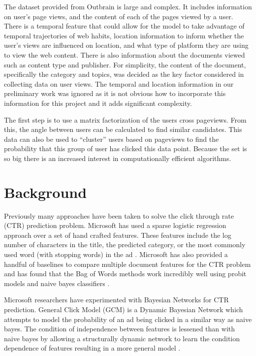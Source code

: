 \documentclass[fleqn,10pt]{SelfArx} %
\begin{document}
The dataset provided from Outbrain is large and complex. It includes information on user’s page views, and the content of each of the pages viewed by a user. There is a temporal feature that could allow for the model to take advantage of temporal trajectories of web habits, location information to inform whether the user’s views are influenced on location, and what type of platform they are using to view the web content. There is also information about the documents viewed such as content type and publisher. For simplicity, the content of the document, specifically the category and topics, was decided as the key factor considered in collecting data on user views. The temporal and location information in our preliminary work was ignored as it is not obvious how to incorporate this information for this project and it adds significant complexity.

The first step is to use a matrix factorization of the users cross pageviews. From this, the angle between users can be calculated to find similar candidates. This data can also be used to “cluster” users based on pageviews to find the probability that this group of user has clicked this data point. Because the set is so big there is an increased interest in computationally efficient algorithms.


\section{Background}

Previously many approaches have been taken to solve the click through rate (CTR) prediction problem.
Microsoft has used a sparse logistic regression approach over a set of hand crafted features. These features include the log number of characters in the title, the predicted category, or the most commonly used word (with stopping words) in the ad \cite{richardson2007predicting}. Microsoft has also provided a handful of baselines to compare multiple document features for the CTR problem and has found that the Bag of Words methods work incredibly well using probit models and naive bayes classifiers \cite{graepel2010web}.

Microsoft researchers have experimented with Bayesian Networks for CTR prediction. General Click Model (GCM) is a Dynamic Bayesian Network which attempts to model the probability of an ad being clicked in a similar way as naive bayes. The condition of independence between features is lessened than with naive bayes by allowing a structurally dynamic network to learn the condition dependence of features resulting in a more general model \cite{zhu2010novel}.
\end{document}
